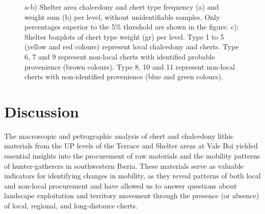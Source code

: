 \documentclass[
  a4paper,
  DIV=11,
  numbers=noendperiod]{scrreprt}
\begin{document}
\begin{figure}


\caption{\label{fig-analysis_shelter}a-b) Shelter area chalcedony and
chert type frequency (a) and weight sum (b) per level, without
unidentifiable samples. Only percentages superior to the 5\% threshold
are shown in the figure. c): Shelter boxplots of chert type weight (gr)
per level. Type 1 to 5 (yellow and red colours) represent local
chalcedony and cherts. Type 6, 7 and 9 represent non-local cherts with
identified probable provenience (brown colours). Type 8, 10 and 11
represent non-local cherts with non-identified provenience (blue and
green colours).}

\end{figure}%

\section{Discussion}\label{discussion}

The macroscopic and petrographic analysis of chert and chalcedony lithic
materials from the UP levels of the Terrace and Shelter areas at Vale
Boi yielded essential insights into the procurement of raw materials and
the mobility patterns of hunter-gatherers in southwestern Iberia. These
materials serve as valuable indicators for identifying changes in
mobility, as they reveal patterns of both local and non-local
procurement and have allowed us to answer questions about landscape
exploitation and territory movement through the presence (or absence) of
local, regional, and long-distance cherts.
\end{document}
